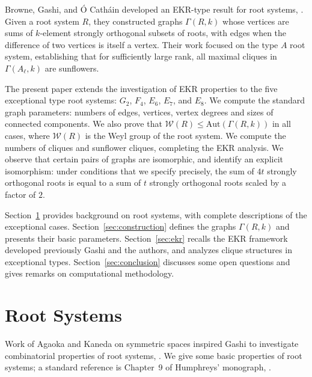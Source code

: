 \documentclass[11pt]{article}
\newcommand{\W}{\mathcal{W}}
\begin{document}
Browne, Gashi, and \'O Cath\'ain developed an EKR-type result for root systems, \cite{BGO}. Given a root system $R$, they constructed graphs $\Gamma(R, k)$ whose vertices are sums of $k$-element strongly orthogonal subsets of roots, with edges when the difference of two vertices is itself a vertex. Their work focused on the type $A$ root system, establishing that for sufficiently large rank, all maximal cliques in $\Gamma(A_\ell, k)$ are sunflowers.

The present paper extends the investigation of EKR properties to the five exceptional type root systems: $G_2$, $F_4$, $E_6$, $E_7$, and $E_8$. We compute the standard graph parameters: numbers of edges, vertices, vertex degrees and sizes of connected components. We also prove that $\W(R) \leq \mathrm{Aut}(\Gamma(R, k))$ in all cases, where $\W(R)$ is the Weyl group of the root system. We compute the numbers of cliques and sunflower cliques, completing the EKR analysis. We observe that certain pairs of graphs are isomorphic, and identify an explicit isomorphism: under conditions that we specify precisely, the sum of $4t$ strongly orthogonal roots is equal to a sum of $t$ strongly orthogonal roots scaled by a factor of $2$. 

Section~\ref{sec:rootsystems} provides background on root systems, with complete descriptions of the exceptional cases. Section~\ref{sec:construction} defines the graphs $\Gamma(R, k)$ and presents their basic parameters. Section~\ref{sec:ekr} recalls the EKR framework developed previously Gashi and the authors, and analyzes clique structures in exceptional types. Section~\ref{sec:conclusion} discusses some open questions and gives remarks on computational methodology.

\section{Root Systems}\label{sec:rootsystems}

Work of Agaoka and Kaneda on symmetric spaces inspired Gashi to investigate combinatorial properties of root systems, \cite{Agaoka} . We give some basic properties of root systems; a standard reference is Chapter~9 of Humphreys' monograph, \cite{Humphreys}.
\end{document}
